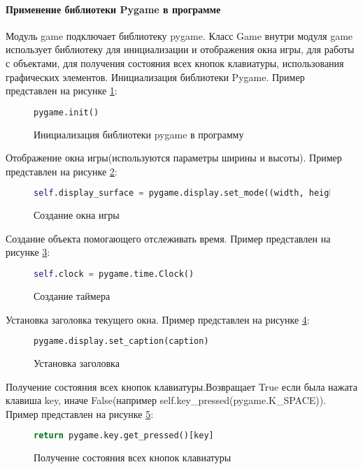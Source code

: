 \paragraph{Применение библиотеки Pygame в программе}
Модуль game подключает библиотеку pygame. Класс Game внутри модуля game использует библиотеку для инициализации и отображения окна игры, для работы с объектами, для получения состояния всех кнопок клавиатуры, использования графических элементов.
Инициализация библиотеки Pygame.
Пример представлен на рисунке \ref{init:image}:
\begin{figure}[H]
	\begin{lstlisting}[language=Python]
		pygame.init()
	\end{lstlisting}  
	\caption{Инициализация библиотеки pygame в программу}
	\label{init:image}
\end{figure}
Отображение окна игры(используются параметры ширины и высоты).
Пример представлен на рисунке \ref{displaysm:image}:
\begin{figure}[H]
	\begin{lstlisting}[language=Python]
		self.display_surface = pygame.display.set_mode((width, height))
	\end{lstlisting}  
	\caption{Создание окна игры}
	\label{displaysm:image}
\end{figure}
Создание объекта помогающего отслеживать время.
Пример представлен на рисунке \ref{clock:image}:
\begin{figure}[H]
	\begin{lstlisting}[language=Python]
		self.clock = pygame.time.Clock()
	\end{lstlisting}  
	\caption{Создание таймера}
	\label{clock:image}
\end{figure}
Установка заголовка текущего окна.
Пример представлен на рисунке \ref{caption:image}:
\begin{figure}[H]
	\begin{lstlisting}[language=Python]
		pygame.display.set_caption(caption)
	\end{lstlisting}  
	\caption{Установка заголовка}
	\label{caption:image}
\end{figure}
Получение состояния всех кнопок клавиатуры.Возвращает True если была нажата клавиша key, иначе False(например self.key\_pressed(pygame.K\_SPACE)).
Пример представлен на рисунке \ref{keyp:image}:
\begin{figure}[H]
	\begin{lstlisting}[language=Python]
		return pygame.key.get_pressed()[key]
	\end{lstlisting}  
	\caption{Получение состояния всех кнопок клавиатуры}
	\label{keyp:image}
\end{figure}
